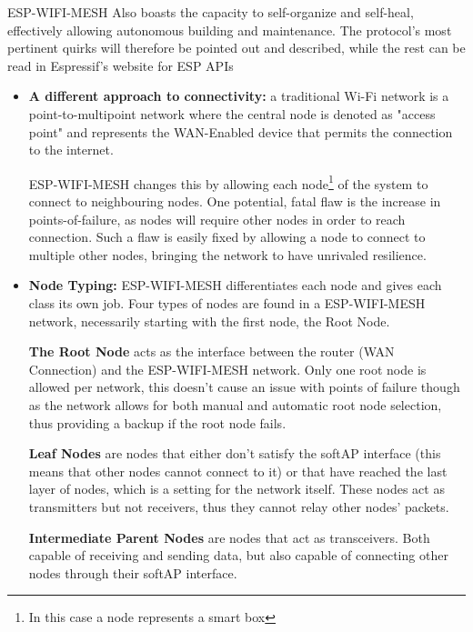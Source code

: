 \documentclass[11pt]{article}
\begin{document}
ESP-WIFI-MESH Also boasts the capacity to self-organize and self-heal, effectively allowing autonomous building and maintenance. The protocol's most pertinent quirks will therefore be pointed out and described, while the rest can be read in Espressif's website for ESP APIs \par \vspace{0.5 cm}
\begin{itemize}
    \item \textbf{A different approach to connectivity:} a traditional Wi-Fi network is a point-to-multipoint network where the central node is denoted as "access point" and represents the WAN-Enabled device that permits the connection to the internet. \par \vspace{0.2 cm}
    ESP-WIFI-MESH changes this by allowing each node\footnote{In this case a node represents a smart box} of the system to connect to neighbouring nodes. One potential, fatal flaw is the increase in points-of-failure, as nodes will require other nodes in order to reach connection. Such a flaw is easily fixed by allowing a node to connect to multiple other nodes, bringing the network to have unrivaled resilience. \par \vspace{0.2 cm}
    \item \textbf{Node Typing:} ESP-WIFI-MESH differentiates each node and gives each class its own job. Four types of nodes are found in a ESP-WIFI-MESH network, necessarily starting with the first node, the Root Node. \par \vspace{0.2 cm}\textbf{The Root Node} acts as the interface between the router (WAN Connection) and the ESP-WIFI-MESH network. Only one root node is allowed per network, this doesn't cause an issue with points of failure though as the network allows for both manual and automatic root node selection, thus providing a backup if the root node fails.  \par \vspace{0.2 cm}
    \textbf{Leaf Nodes} are nodes that either don't satisfy the softAP interface (this means that other nodes cannot connect to it) or that have reached the last layer of nodes, which is a setting for the network itself. These nodes act as transmitters but not receivers, thus they cannot relay other nodes' packets. \par \vspace{0.2 cm}
    \textbf{Intermediate Parent Nodes} are nodes that act as transceivers. Both capable of receiving and sending data, but also capable of connecting other nodes through their softAP interface. \par \vspace{0.2 cm}

\end{itemize}
\end{document}
